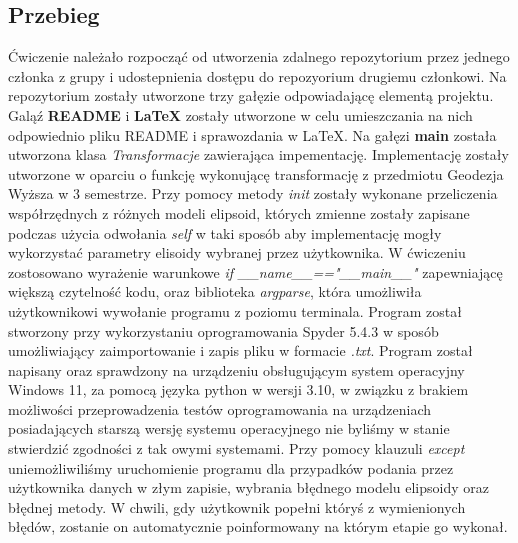 \documentclass[a4paper,titleauthor]{mwart}
\begin{document}
    \subsection{Przebieg}
    Ćwiczenie należało rozpocząć od utworzenia zdalnego repozytorium przez jednego członka z grupy i udostepnienia dostępu do repozyorium drugiemu członkowi. Na repozytorium zostały utworzone trzy gałęzie odpowiadającę elementą projektu. Galąź \textbf{README} i \textbf{LaTeX} zostały utworzone w celu umieszczania  na nich odpowiednio pliku README i sprawozdania w LaTeX. Na gałęzi \textbf{main} została utworzona klasa \textit{Transformacje} 
    zawierająca impementację. Implementację zostały utworzone w oparciu o funkcję wykonującę transformację z przedmiotu Geodezja Wyższa w 3 semestrze. Przy pomocy metody \textit{init} zostały wykonane przeliczenia współrzędnych z różnych modeli elipsoid, których zmienne zostały zapisane podczas użycia odwołania \textit{self} w taki sposób aby implementację mogły wykorzystać parametry elisoidy wybranej przez użytkownika. W ćwiczeniu zostosowano wyrażenie warunkowe \textit{if \_\_name\_\_=="\_\_main\_\_"} zapewniającę większą czytelność kodu, oraz biblioteka \textit{argparse}, która umożliwiła użytkownikowi wywołanie programu z poziomu terminala.
    \newline
    Program został stworzony przy wykorzystaniu oprogramowania Spyder 5.4.3 w sposób umożliwiający zaimportowanie i zapis pliku w formacie \textit{.txt}.
    Program został napisany oraz sprawdzony na urządzeniu obsługującym system operacyjny Windows 11, za pomocą języka python w wersji 3.10, w związku z brakiem możliwości przeprowadzenia testów oprogramowania na urządzeniach posiadających starszą wersję systemu operacyjnego nie byliśmy w stanie stwierdzić zgodności z tak owymi systemami. Przy pomocy klauzuli \textit{except} uniemożliwiliśmy uruchomienie programu dla przypadków podania przez użytkownika danych w złym zapisie, wybrania błędnego modelu elipsoidy oraz błędnej metody. W chwili, gdy użytkownik popełni któryś z wymienionych błędów, zostanie on      automatycznie poinformowany na którym etapie go wykonał. 
\end{document}
